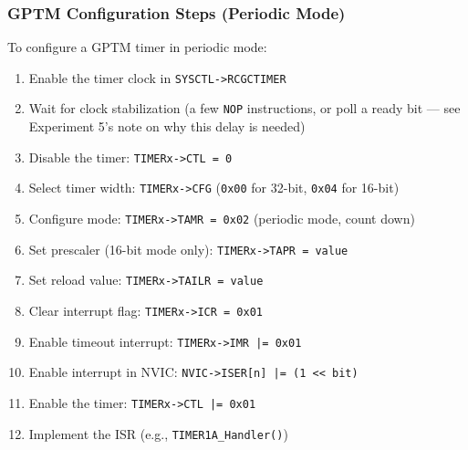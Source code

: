 \subsubsection{GPTM Configuration Steps (Periodic Mode)}

To configure a GPTM timer in periodic mode:

\begin{enumerate}[nosep]
  \item Enable the timer clock in \texttt{SYSCTL->RCGCTIMER}
  \item Wait for clock stabilization (a few \texttt{NOP} instructions, or poll a ready bit — see Experiment 5's note on why this delay is needed)
  \item Disable the timer: \texttt{TIMERx->CTL = 0}
  \item Select timer width: \texttt{TIMERx->CFG} (\texttt{0x00} for 32-bit, \texttt{0x04} for 16-bit)
  \item Configure mode: \texttt{TIMERx->TAMR = 0x02} (periodic mode, count down)
  \item Set prescaler (16-bit mode only): \texttt{TIMERx->TAPR = value}
  \item Set reload value: \texttt{TIMERx->TAILR = value}
  \item Clear interrupt flag: \texttt{TIMERx->ICR = 0x01}
  \item Enable timeout interrupt: \texttt{TIMERx->IMR |= 0x01}
  \item Enable interrupt in NVIC: \texttt{NVIC->ISER[n] |= (1 << bit)}
  \item Enable the timer: \texttt{TIMERx->CTL |= 0x01}
  \item Implement the ISR (e.g., \texttt{TIMER1A\_Handler()})
\end{enumerate}

